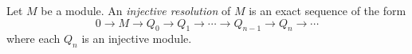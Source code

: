 \documentclass[12pt]{article}
\begin{document}
Let $M$ be a module.  An {\it injective resolution} of $M$
is an exact sequence of the form
$$0 \to M \to Q_0 \to Q_1 \to \cdots \to Q_{n-1} \to Q_n \to \cdots$$
where each $Q_n$ is an injective module.
\end{document}

